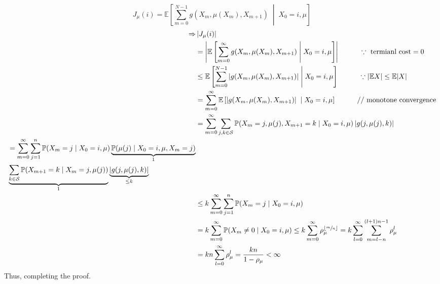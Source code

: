 \begin{lemmaproof}
    \[
        J_\mu (i) = \mathbb{E} \left[
        \sum_{m=0}^{N-1} g(X_m,\mu(X_m),X_{m+1}) \;\middle|\; X_0 = i, \mu
         \right]
    \]
    \begin{align*}
        \Rightarrow & \left\vert J_\mu (i) \right\vert\\
         &=  \left\vert  \mathbb{E} \left[
            \sum_{m=0}^{\infty} 
            g(X_m,\mu(X_m),X_{m+1})  \;\middle|\; X_0 = i, \mu
             \right]\right\vert \qquad \quad \because \text{ termianl cost} = 0 \\
        & \leq \mathbb{E} \left[
            \sum_{m=0}^{N-1} \left\vert g(X_m,\mu(X_m),X_{m+1}) \right\vert \;\middle|\; X_0 = i, \mu
                \right]\qquad \quad \because \left\vert \mathbb{E} X \right\vert \leq  \mathbb{E} \vert X \vert  \\
        & = \sum_{m=0}^{\infty} \mathbb{E} \left[ 
            \vert g(X_m,\mu(X_m),X_{m+1}) \vert \; \mid  X_0 = i, \mu
             \right] \qquad \quad \text{// monotone convergence} \\
        &= \sum_{m=0}^{\infty} \sum_{j,k \in \mathcal{S} } \mathbb{P} 
        (X_m = j, \mu (j), X_{m+1} =  k \mid X_0 = i, \mu ) \left\vert g(j,\mu(j),k) \right\vert \\
        \begin{split}
        &= \sum_{m=0}^{\infty} \sum_{j=1}^n \mathbb{P}(X_m = j \mid X_0 = i, \mu )
        \underbrace{\mathbb{P}(\mu (j) \mid X_0 = i, \mu ,X_m = j)}_{1}\\
            {} &
            \underbrace{\sum_{k \in \mathcal{S}}\mathbb{P} (X_{m+1} = k \mid X_m = j, \mu (j))}_{1}
            \underbrace{\left\vert g(j,\mu(j),k) \right\vert}_{ \leq k} \\
        \end{split}\\
        & \leq k \sum_{m=0}^{\infty} \sum_{j=1}^n \mathbb{P}(X_m = j \mid X_0 = i, \mu )\\  
        & = k \sum_{m=0}^{\infty} \mathbb{P}(X_m \neq 0 \mid X_0 = i, \mu )
        \leq k \sum_{m=0}^{\infty} \rho_\mu^{\lfloor \sfrac{m}{n} \rfloor}
        = k \sum_{l=0}^{\infty} \sum_{m=l-n}^{(l+1)n - 1} \rho_\mu^l\\
        &= kn \sum_{l=0}^{\infty} \rho_\mu^l = \frac{kn}{1-\rho_\mu} < \infty
    \end{align*}
    Thus, completing the proof.
\end{lemmaproof}

